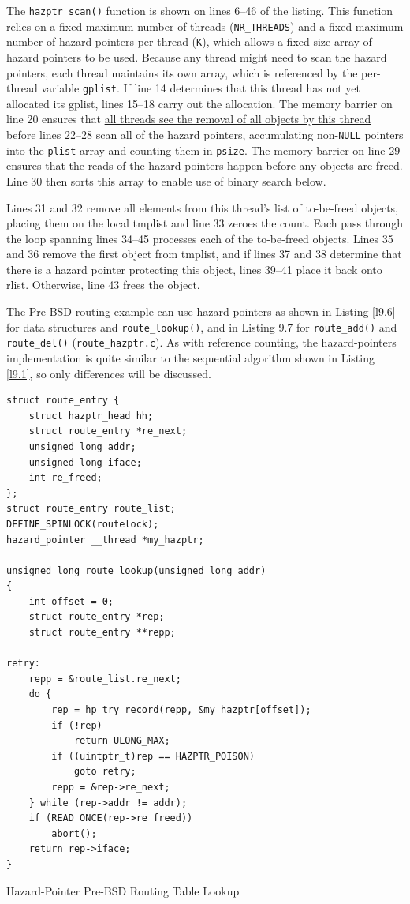 \documentclass[11pt]{article}
\begin{document}
The \texttt{hazptr\_scan()} function is shown on lines 6–46 of the listing. This function relies on a fixed
maximum number of threads (\texttt{NR\_THREADS}) and a fixed maximum number of hazard pointers per thread (\texttt{K}),
which allows a fixed-size array of hazard pointers to be used. Because any thread might need to scan
the hazard pointers, each thread maintains its own array, which is referenced by the per-thread
variable \texttt{gplist}. If line 14 determines that this thread has not yet allocated its gplist, lines 15–18
carry out the allocation. The memory barrier on line 20 ensures that \uline{all threads see the removal of
all objects by this thread} before lines 22–28 scan all of the hazard pointers, accumulating non-\texttt{NULL}
pointers into the \texttt{plist} array and counting them in \texttt{psize}. The memory barrier on line 29 ensures that
the reads of the hazard pointers happen before any objects are freed. Line 30 then sorts this array to
enable use of binary search below.

Lines 31 and 32 remove all elements from this thread’s list of to-be-freed objects, placing them on
the local tmplist and line 33 zeroes the count. Each pass through the loop spanning lines 34–45
processes each of the to-be-freed objects. Lines 35 and 36 remove the first object from tmplist, and
if lines 37 and 38 determine that there is a hazard pointer protecting this object, lines 39–41 place
it back onto rlist. Otherwise, line 43 frees the object.

The Pre-BSD routing example can use hazard pointers as shown in Listing \ref{l9.6} for data structures
and \texttt{route\_lookup()}, and in Listing 9.7 for \texttt{route\_add()} and \texttt{route\_del()} (\texttt{route\_hazptr.c}). As with
reference counting, the hazard-pointers implementation is quite similar to the sequential algorithm
shown in Listing \ref{l9.1}, so only differences will be discussed.
\begin{listing}[htbp]
\begin{verbatim}
struct route_entry {
    struct hazptr_head hh;
    struct route_entry *re_next;
    unsigned long addr;
    unsigned long iface;
    int re_freed;
};
struct route_entry route_list;
DEFINE_SPINLOCK(routelock);
hazard_pointer __thread *my_hazptr;

unsigned long route_lookup(unsigned long addr)
{
    int offset = 0;
    struct route_entry *rep;
    struct route_entry **repp;

retry:
    repp = &route_list.re_next;
    do {
        rep = hp_try_record(repp, &my_hazptr[offset]);
        if (!rep)
            return ULONG_MAX;
        if ((uintptr_t)rep == HAZPTR_POISON)
            goto retry;
        repp = &rep->re_next;
    } while (rep->addr != addr);
    if (READ_ONCE(rep->re_freed))
        abort();
    return rep->iface;
}
\end{verbatim}
\caption{\label{l9.6}Hazard-Pointer Pre-BSD Routing Table Lookup}
\end{listing}
\end{document}
